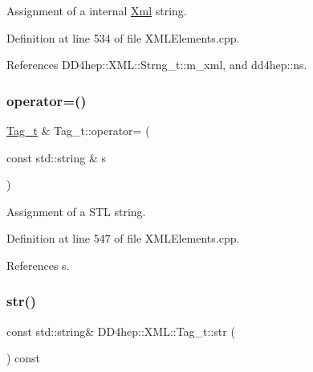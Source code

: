 Assignment of a internal \hyperlink{union_xml}{Xml} string. 



Definition at line 534 of file X\+M\+L\+Elements.\+cpp.



References D\+D4hep\+::\+X\+M\+L\+::\+Strng\+\_\+t\+::m\+\_\+xml, and dd4hep\+::ns.

\hypertarget{class_d_d4hep_1_1_x_m_l_1_1_tag__t_a75956372cda85919960d01308ead3b53}{}\label{class_d_d4hep_1_1_x_m_l_1_1_tag__t_a75956372cda85919960d01308ead3b53} 
\subsubsection{\texorpdfstring{operator=()}{operator=()}\hspace{0.1cm}{\footnotesize\ttfamily [4/4]}}
{\footnotesize\ttfamily \hyperlink{class_d_d4hep_1_1_x_m_l_1_1_tag__t}{Tag\+\_\+t} \& Tag\+\_\+t\+::operator= (\begin{DoxyParamCaption}\item[{const std\+::string \&}]{s }\end{DoxyParamCaption})}



Assignment of a S\+TL string. 



Definition at line 547 of file X\+M\+L\+Elements.\+cpp.



References s.

\hypertarget{class_d_d4hep_1_1_x_m_l_1_1_tag__t_a05943049115d80e4de64e7eb7c7a6798}{}\label{class_d_d4hep_1_1_x_m_l_1_1_tag__t_a05943049115d80e4de64e7eb7c7a6798} 
\subsubsection{\texorpdfstring{str()}{str()}}
{\footnotesize\ttfamily const std\+::string\& D\+D4hep\+::\+X\+M\+L\+::\+Tag\+\_\+t\+::str (\begin{DoxyParamCaption}{ }\end{DoxyParamCaption}) const\hspace{0.3cm}{\ttfamily [inline]}}



